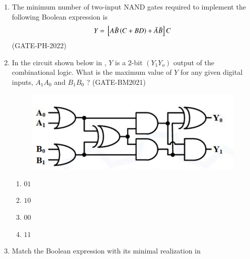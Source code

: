 \begin{enumerate}[label=\arabic*.,ref=\theenumi]
\item The minimum number of two-input NAND gates required to implement the following Boolean expression is \underline{\hspace{4cm}}
\begin{align*}
Y={}\left[A\bar{B}\left(C+BD\right)+\bar{A}\bar{B}\right]C
\end{align*}
\hfill(GATE-PH-2022)

\item In the circuit shown below in 
,
 $Y$ is a $2$-bit $(Y_1Y_o)$ output of the combinational logic. What is the 
maximum value of $Y$ for any given digital inputs, $A_1A_0$ and $B_1B_0$ ?
\hfill(GATE-BM2021)
\begin{figure}[!ht]
\centering
\includegraphics[width=\columnwidth]{ide/kmap/figs/Fig-1.png}
\caption{}
\label{fig:fig-1.png}
\end{figure}
\begin{enumerate}[label=(\Alph*)]
\item $01$
\item $10$
\item $00$
\item $11$
\end{enumerate}
\item Match the Boolean expression with its minimal realization
	in 
	\begin{table}[!ht]
		\centering
\end{table}
\end{enumerate}
